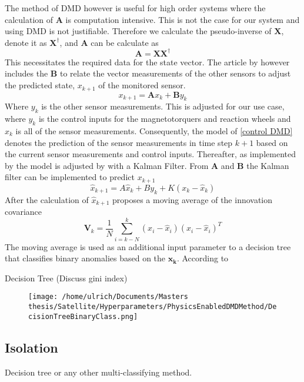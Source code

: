 \documentclass[letterpaper, 10 pt, conference]{ieeeconf}  %
\begin{document}
The method of DMD however is useful for high order systems where the calculation of $\mathbf{A}$ is computation intensive. This is not the case for our system and using DMD is not justifiable. Therefore we calculate the pseudo-inverse of $\mathbf{X}$, denote it as $\mathbf{X^{\dagger}}$, and $\mathbf{A}$ can be calculate as
\begin{equation}
	\mathbf{A} = \mathbf{X}\mathbf{X^{\dagger}}
\end{equation}
This necessitates the required data for the state vector. The article by \textcite{DeSilva2020} however includes the $\mathbf{B}$ to relate the vector measurements of the other sensors to adjust the predicted state, $x_{k+1}$ of the monitored sensor. 
\begin{equation}
	x_{k+1} = \boldsymbol{A}x_k + \boldsymbol{B}y_k
	\label{control DMD}
\end{equation}
Where $y_k$ is the other sensor measurements. This is adjusted for our use case, where $y_k$ is the control inputs for the magnetotorquers and reaction wheels and $x_k$ is all of the sensor measurements. Consequently, the model of \ref{control DMD} denotes the prediction of the sensor measurements in time step $k+1$ based on the current sensor measurements and control inputs.
Thereafter, as implemented by \textcite{DeSilva2020} the model is adjusted by with a Kalman Filter. From $\boldsymbol{A}$ and $\boldsymbol{B}$ the Kalman filter can be implemented to predict $x_{k+1}$
\begin{equation}
	\hat{x}_{k+1} = A\hat{x}_k + By_k + K(x_k - \hat{x}_k)
\end{equation}
After  the calculation of $\hat{x}_{k+1}$ \textcite{DeSilva2020} proposes a moving average of the innovation covariance
\begin{equation}
	\boldsymbol{V}_k = \frac{1}{N} \sum_{i=k-N}^k (x_i - \hat{x}_i)(x_i - \hat{x}_i)^T
\end{equation}
The moving average is used as an additional input parameter to a decision tree that classifies binary anomalies based on the $\boldsymbol{x_k}$. According to

Decision Tree (Discuss gini index)

\begin{figure}[!htb]
\texttt{[image: /home/ulrich/Documents/Masters thesis/Satellite/Hyperparameters/PhysicsEnabledDMDMethod/DecisionTreeBinaryClass.png]}
\end{figure}

\subsection{Isolation}
Decision tree or any other multi-classifying method.
\end{document}
